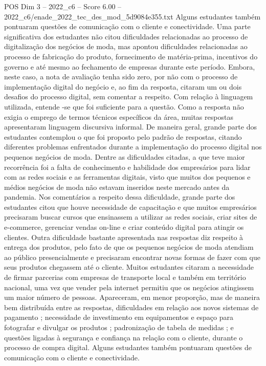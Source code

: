 \begin{textsample}{POS Dim 3 – 2022\_c6 – Score 6.00 – 2022\_c6/enade\_2022\_tec\_des\_mod\_5d9084e355.txt}
Alguns estudantes também pontuaram questões de comunicação com o cliente e conectividade.
Uma parte significativa dos estudantes não citou dificuldades relacionadas ao processo de digitalização dos negócios de moda, mas apontou dificuldades relacionadas ao processo de fabricação do produto, fornecimento de matéria-prima, incentivos do governo e até mesmo ao fechamento de empresas durante este período.
Embora, neste caso, a nota de avaliação tenha sido zero, por não com o processo de implementação digital do negócio e, ao fim da resposta, citaram um ou dois desafios do processo digital, sem comentar a respeito.
Com relação à linguagem utilizada, entende -se que foi suficiente para a questão.
Como a resposta não exigia o emprego de termos técnicos específicos da área, muitas respostas apresentaram linguagem discursiva informal.
De maneira geral, grande parte dos estudantes contemplou o que foi proposto pelo padrão de respostas, citando diferentes problemas enfrentados durante a implementação do processo digital nos pequenos negócios de moda.
Dentre as dificuldades citadas, a que teve maior recorrência foi a falta de conhecimento e habilidade dos empresários para lidar com as redes sociais e as ferramentas digitais, visto que muitos dos pequenos e médios negócios de moda não estavam inseridos neste mercado antes da pandemia.
Nos comentários a respeito dessa dificuldade, grande parte dos estudantes citou que houve necessidade de capacitação e que muitos empresários precisaram buscar cursos que ensinassem a utilizar as redes sociais, criar sites de e-commerce, gerenciar vendas on-line e criar conteúdo digital para atingir os clientes.
Outra dificuldade bastante apresentada nas respostas diz respeito à entrega dos produtos, pelo fato de que os pequenos negócios de moda atendiam ao público presencialmente e precisaram encontrar novas formas de fazer com que seus produtos chegassem até o cliente.
Muitos estudantes citaram a necessidade de firmar parcerias com empresas de transporte local e também em território nacional, uma vez que vender pela internet permitiu que os negócios atingissem um maior número de pessoas.
Apareceram, em menor proporção, mas de maneira bem distribuída entre as respostas, dificuldades em relação aos novos sistemas de pagamento ; necessidade de investimento em equipamentos e espaço para fotografar e divulgar os produtos ; padronização de tabela de medidas ; e questões ligadas à segurança e confiança na relação com o cliente, durante o processo de compra digital.
Alguns estudantes também pontuaram questões de comunicação com o cliente e conectividade.

\end{textsample}
